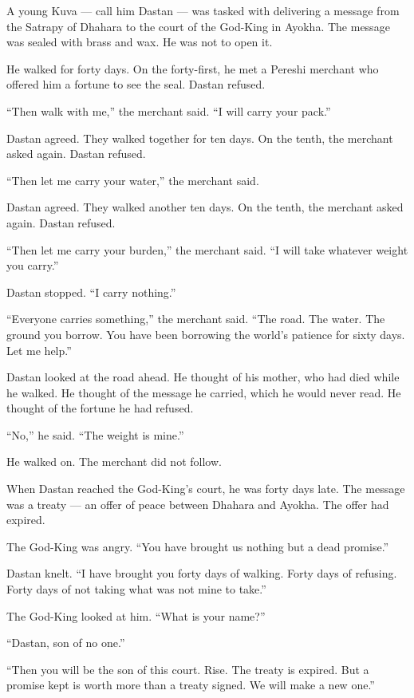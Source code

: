 \documentclass[10pt,twoside]{book}
\begin{document}
A young Kuva --- call him Dastan --- was tasked with delivering a message from the Satrapy of Dhahara to the court of the God-King in Ayokha. The message was sealed with brass and wax. He was not to open it.

He walked for forty days. On the forty-first, he met a Pereshi merchant who offered him a fortune to see the seal. Dastan refused.

``Then walk with me,'' the merchant said. ``I will carry your pack.''

Dastan agreed. They walked together for ten days. On the tenth, the merchant asked again. Dastan refused.

``Then let me carry your water,'' the merchant said.

Dastan agreed. They walked another ten days. On the tenth, the merchant asked again. Dastan refused.

``Then let me carry your burden,'' the merchant said. ``I will take whatever weight you carry.''

Dastan stopped. ``I carry nothing.''

``Everyone carries something,'' the merchant said. ``The road. The water. The ground you borrow. You have been borrowing the world's patience for sixty days. Let me help.''

Dastan looked at the road ahead. He thought of his mother, who had died while he walked. He thought of the message he carried, which he would never read. He thought of the fortune he had refused.

``No,'' he said. ``The weight is mine.''

He walked on. The merchant did not follow.

When Dastan reached the God-King's court, he was forty days late. The message was a treaty --- an offer of peace between Dhahara and Ayokha. The offer had expired.

The God-King was angry. ``You have brought us nothing but a dead promise.''

Dastan knelt. ``I have brought you forty days of walking. Forty days of refusing. Forty days of not taking what was not mine to take.''

The God-King looked at him. ``What is your name?''

``Dastan, son of no one.''

``Then you will be the son of this court. Rise. The treaty is expired. But a promise kept is worth more than a treaty signed. We will make a new one.''
\end{document}
